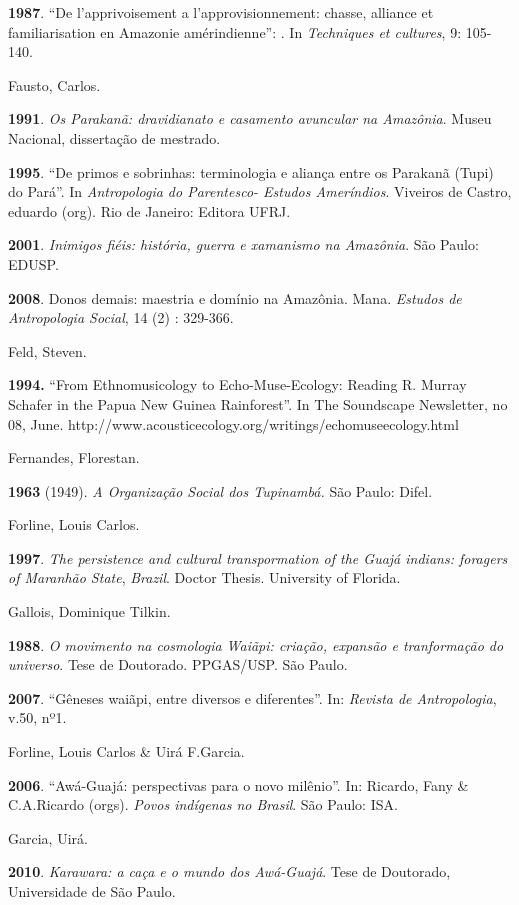 \textbf{1987}. ``De l'apprivoisement a l'approvisionnement: chasse,
alliance et familiarisation en Amazonie amérindienne'': . In
\emph{Techniques et cultures}, 9: 105-140.

Fausto, Carlos.

\textbf{1991}. \emph{Os Parakanã: dravidianato e casamento avuncular na
Amazônia}. Museu Nacional, dissertação de mestrado.

\textbf{1995}. ``De primos e sobrinhas: terminologia e aliança entre os
Parakanã (Tupi) do Pará''. In \emph{Antropologia do Parentesco- Estudos
Ameríndios}. Viveiros de Castro, eduardo (org). Rio de Janeiro: Editora
UFRJ.

\textbf{2001}. \emph{Inimigos fiéis: história, guerra e xamanismo na
Amazônia}. São Paulo: EDUSP.

\textbf{2008}. Donos demais: maestria e domínio na Amazônia. Mana.
\emph{Estudos de Antropologia Social}, 14 (2) : 329-366.

Feld, Steven.

\textbf{1994.} ``From Ethnomusicology to Echo-Muse-Ecology: Reading R.
Murray Schafer in the Papua New Guinea Rainforest''. In The Soundscape
Newsletter, no 08, June.
http://www.acousticecology.org/writings/echomuseecology.html

Fernandes, Florestan.

\textbf{1963} (1949). \emph{A Organização Social dos Tupinambá.} São
Paulo: Difel.

Forline, Louis Carlos.

\textbf{1997}. \emph{The persistence and cultural transpormation of the
Guajá indians: foragers of Maranhão State}, \emph{Brazil}. Doctor
Thesis. University of Florida.

Gallois, Dominique Tilkin.

\textbf{1988}. \emph{O movimento na cosmologia Waiãpi: criação, expansão
e tranformação do universo}. Tese de Doutorado. PPGAS/USP. São Paulo.

\textbf{2007}. ``Gêneses waiãpi, entre diversos e diferentes''. In:
\emph{Revista de Antropologia}, v.50, nº1.

Forline, Louis Carlos \& Uirá F.Garcia.

\textbf{2006}. ``Awá-Guajá: perspectivas para o novo milênio''. In:
Ricardo, Fany \& C.A.Ricardo (orgs). \emph{Povos indígenas no Brasil}.
São Paulo: ISA.

Garcia, Uirá.

\textbf{2010}. \emph{Karawara: a caça e o mundo dos Awá-Guajá}. Tese de
Doutorado, Universidade de São Paulo.

